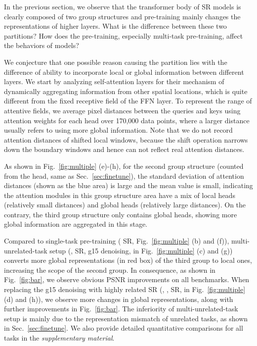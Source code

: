 \documentclass[runningheads]{llncs}
\begin{document}
	In the previous section, we observe that the transformer body of SR models is clearly composed of two group structures and pre-training mainly changes the representations of higher layers. What is the difference between these two partitions? How does the pre-training, especially multi-task pre-training, affect the behaviors of models?


	We conjecture that one possible reason causing the partition lies with the difference of ability to incorporate local or global information between different layers. We start by analyzing self-attention layers for their mechanism of dynamically aggregating information from other spatial locations, which is quite different from the fixed receptive field of the FFN layer. To represent the range of attentive fields, we average pixel distances between the queries and keys using attention weights for each head over 170,000 data points, where a larger distance usually refers to using more global information. Note that we do not record attention distances of shifted local windows, because the shift operation narrows down the boundary windows and hence can not reflect real attention distances.
	
	As shown in Fig.~\ref{fig:multiple} (e)-(h), for the second group structure (counted from the head, same as Sec.~\ref{sec:finetune}), the standard deviation of attention distances (shown as the blue area) is large and the mean value is small, indicating the attention modules in this group structure area have a mix of local heads (relatively small distances) and global heads (relatively large distances). On the contrary, the third group structure only contains global heads, showing more global information are aggregated in this stage.
	
	Compared to single-task pre-training ( SR, Fig.~\ref{fig:multiple} (b) and (f)), multi-unrelated-task setup (,  SR, g15 denoising, in Fig.~\ref{fig:multiple} (c) and (g)) converts more global representations (in red box) of the third group to local ones, increasing the scope of the second group. In consequence, as shown in Fig.~\ref{fig:bar}, we observe obvious PSNR improvements on all benchmarks. When replacing the g15 denoising with highly related  SR (, ,  SR, in Fig.~\ref{fig:multiple} (d) and (h)), we observe more changes in global representations, along with further improvements in Fig.~\ref{fig:bar}. The inferiority of multi-unrelated-task setup is mainly due to the representation mismatch of unrelated tasks, as shown in Sec.~\ref{sec:finetune}. We also provide detailed quantitative comparisons for all tasks in the \textit{supplementary material}.
	
\end{document}

